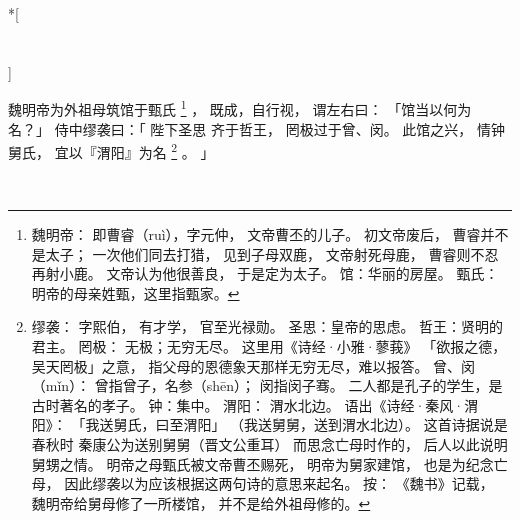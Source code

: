 
\switchcolumn[0]*[\section{}]

魏明帝为外祖母筑馆于甄氏%
\footnote{%
    魏明帝：
        即曹睿（ruì），字元仲，
        文帝曹丕的儿子。
        初文帝废后，
        曹睿并不是太子；
        一次他们同去打猎，
        见到子母双鹿，
        文帝射死母鹿，
        曹睿则不忍再射小鹿。
        文帝认为他很善良，
        于是定为太子。
    馆：华丽的房屋。
    甄氏：明帝的母亲姓甄，这里指甄家。
}%
，
既成，自行视，
谓左右曰：
「馆当以何为名？」
侍中缪袭曰：「
    陛下圣思
    齐于哲王，
    罔极过于曾、闵。
    此馆之兴，
    情钟舅氏，
    宜以『渭阳』为名%
    \footnote{%
        缪袭：
            字熙伯，
            有才学，
            官至光禄勋。
        圣思：皇帝的思虑。
        哲王：贤明的君主。
        罔极：
            无极；无穷无尽。
            这里用《诗经·小雅·蓼莪》
            「欲报之德，吴天罔极」之意，
            指父母的恩德象天那样无穷无尽，难以报答。
        曾、闵（mǐn）：
            曾指曾子，名参（shēn）；
            闵指闵子骞。
            二人都是孔子的学生，是古时著名的孝子。
        钟：集中。
        渭阳：
            渭水北边。
            语出《诗经·秦风·渭阳》：
            「我送舅氏，曰至渭阳」
            （我送舅舅，送到渭水北边）。
            这首诗据说是春秋时
            秦康公为送别舅舅（晋文公重耳）
            而思念亡母时作的，
            后人以此说明舅甥之情。
            明帝之母甄氏被文帝曹丕赐死，
            明帝为舅家建馆，
            也是为纪念亡母，
            因此缪袭以为应该根据这两句诗的意思来起名。
        按：
            《魏书》记载，
            魏明帝给舅母修了一所楼馆，
            并不是给外祖母修的。
    }%
    。
」

\switchcolumn



    
